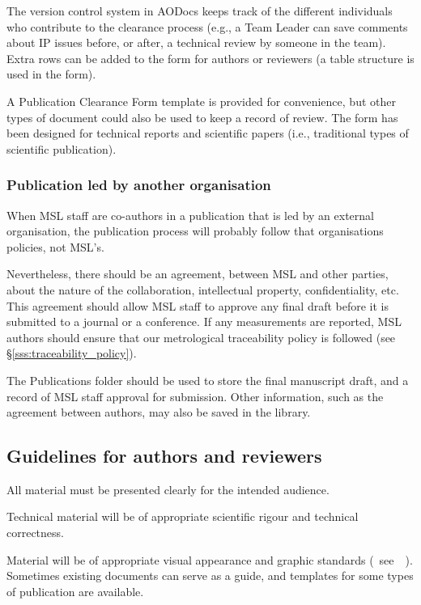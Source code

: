 The version control system in AODocs keeps track of the different individuals who contribute to the clearance process (e.g., a Team Leader can save comments about IP issues before, or after, a technical review by someone in the team). Extra rows can be added to the form for authors or reviewers (a table structure is used in the form).

A Publication Clearance Form template is provided for convenience, but other types of document could also be used to keep a record of review. The form has been designed for technical reports and scientific papers (i.e., traditional types of scientific publication).  

\subsubsection{Publication led by another organisation}

When MSL staff are co-authors in a publication that is led by an external organisation, the publication process will probably follow that organisations policies, not MSL's. 

Nevertheless, there should be an agreement, between MSL and other parties, about the nature of the collaboration, intellectual property, confidentiality, etc. This agreement should allow MSL staff to approve any final draft before it is submitted to a journal or a conference. If any measurements are reported, MSL authors should ensure that our metrological traceability policy is followed (see \S\ref{sss:traceability_policy}).

The Publications folder should be used to store the final manuscript draft, and a record of MSL staff approval for submission. Other information, such as the agreement between authors, may also be saved in the library. 

\subsection{Guidelines for authors and reviewers}
All material must be presented clearly for the intended audience.

Technical material will be of appropriate scientific rigour and technical correctness. 

Material will be of appropriate visual appearance and graphic standards (~see~\cite[\S\ref*{GRP-s:scientific_documents}]{MSL_Reporting_Guidelines}~). Sometimes existing documents can serve as a guide, and templates for some types of publication are available.  

